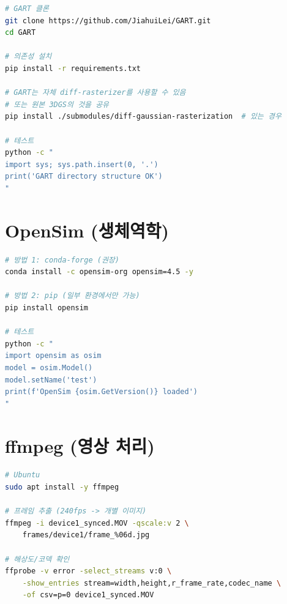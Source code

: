 \documentclass[11pt, a4paper]{report}
\begin{document}
\begin{termbox}[title={GART 설치}]
\begin{lstlisting}[language=bash, numbers=none]
# GART 클론
git clone https://github.com/JiahuiLei/GART.git
cd GART

# 의존성 설치
pip install -r requirements.txt

# GART는 자체 diff-rasterizer를 사용할 수 있음
# 또는 원본 3DGS의 것을 공유
pip install ./submodules/diff-gaussian-rasterization  # 있는 경우

# 테스트
python -c "
import sys; sys.path.insert(0, '.')
print('GART directory structure OK')
"
\end{lstlisting}
\end{termbox}


\section{OpenSim (생체역학)}

\begin{termbox}[title={OpenSim Python 바인딩 설치}]
\begin{lstlisting}[language=bash, numbers=none]
# 방법 1: conda-forge (권장)
conda install -c opensim-org opensim=4.5 -y

# 방법 2: pip (일부 환경에서만 가능)
pip install opensim

# 테스트
python -c "
import opensim as osim
model = osim.Model()
model.setName('test')
print(f'OpenSim {osim.GetVersion()} loaded')
"
\end{lstlisting}
\end{termbox}

\section{ffmpeg (영상 처리)}

\begin{termbox}[title={ffmpeg 설치}]
\begin{lstlisting}[language=bash, numbers=none]
# Ubuntu
sudo apt install -y ffmpeg

# 프레임 추출 (240fps -> 개별 이미지)
ffmpeg -i device1_synced.MOV -qscale:v 2 \
    frames/device1/frame_%06d.jpg

# 해상도/코덱 확인
ffprobe -v error -select_streams v:0 \
    -show_entries stream=width,height,r_frame_rate,codec_name \
    -of csv=p=0 device1_synced.MOV
\end{lstlisting}
\end{termbox}
\end{document}
